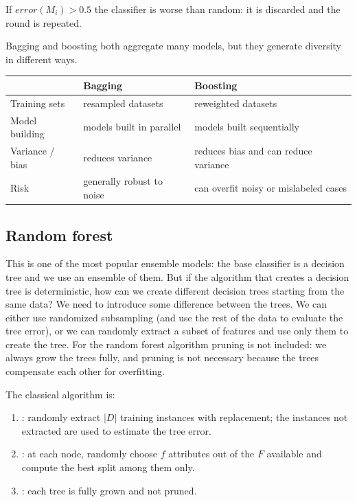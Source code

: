 \begin{remark}
If $error(M_i) > 0.5$ the classifier is worse than random: it is discarded and the round is repeated.
\end{remark}

Bagging and boosting both aggregate many models, but they generate diversity in different ways.
\begin{center}
\begin{tabular}{lll}
\toprule
 & Bagging & Boosting \\
\midrule
Training sets & resampled datasets & reweighted datasets \\
Model building & models built in parallel & models built sequentially \\
Variance / bias & reduces variance & reduces bias and can reduce variance \\
Risk & generally robust to noise & can overfit noisy or mislabeled cases \\
\bottomrule
\end{tabular}
\end{center}

\subsection{Random forest}

This is one of the most popular ensemble models: the base classifier is a decision tree and we use an ensemble of them. But if the algorithm that creates a decision tree is deterministic, how can we create different decision trees starting from the same data? We need to introduce some difference between the trees. We can either use randomized subsampling (and use the rest of the data to evaluate the tree error), or we can randomly extract a subset of features and use only them to create the tree. For the random forest algorithm pruning is not included: we always grow the trees fully, and pruning is not necessary because the trees compensate each other for overfitting.

The classical algorithm is:
\begin{enumerate}
  \item {}: randomly extract $|D|$ training instances with replacement; the instances not extracted are used to estimate the tree error.
  \item {}: at each node, randomly choose $f$ attributes out of the $F$ available and compute the best split among them only.
  \item {}: each tree is fully grown and not pruned.
\end{enumerate}

